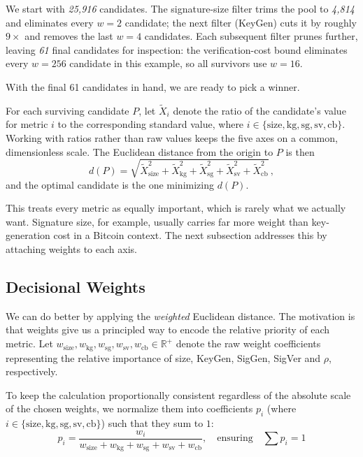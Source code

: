 We start with \emph{25,916} candidates. The signature-size filter trims the pool to \emph{4,814} and eliminates every $w = 2$ candidate; the next filter (KeyGen) cuts it by roughly $9\times$ and removes the last $w = 4$ candidates. Each subsequent filter prunes further, leaving \emph{61} final candidates for inspection: the verification-cost bound eliminates every $w = 256$ candidate in this example, so all survivors use $w = 16$.

With the final 61 candidates in hand, we are ready to pick a winner.

For each surviving candidate $P$, let $\widetilde{X}_i$ denote the ratio of the candidate's value for metric $i$ to the corresponding standard value, where $i \in \{\text{size}, \text{kg}, \text{sg}, \text{sv}, \text{cb}\}$. Working with ratios rather than raw values keeps the five axes on a common, dimensionless scale. The Euclidean distance from the origin to $P$ is then
\begin{equation}
    d(P) = \sqrt{\widetilde{X}_{\text{size}}^2 + \widetilde{X}_{\text{kg}}^2 + \widetilde{X}_{\text{sg}}^2 + \widetilde{X}_{\text{sv}}^2 + \widetilde{X}_{\text{cb}}^2}\,,
    \label{eq:euclidean_distance}
\end{equation}
and the optimal candidate is the one minimizing $d(P)$.

This treats every metric as equally important, which is rarely what we actually want. Signature size, for example, usually carries far more weight than key-generation cost in a Bitcoin context. The next subsection addresses this by attaching weights to each axis.

\subsection{Decisional Weights} \label{sec:decisional-weights}
We can do better by applying the \emph{weighted} Euclidean distance. The motivation is that weights give us a principled way to encode the relative priority of each metric. Let $w_{\text{size}}, w_{\text{kg}}, w_{\text{sg}}, w_{\text{sv}}, w_{\text{cb}} \in \mathbb{R}^+$ denote the raw weight coefficients representing the relative importance of size, KeyGen, SigGen, SigVer and $\rho$, respectively.

To keep the calculation proportionally consistent regardless of the absolute scale of the chosen weights, we normalize them into coefficients $p_i$ (where $i \in \{\text{size}, \text{kg}, \text{sg}, \text{sv}, \text{cb}\}$) such that they sum to $1$:
\begin{equation}
    p_i = \frac{w_i}{w_{\text{size}} + w_{\text{kg}} + w_{\text{sg}} + w_{\text{sv}} + w_{\text{cb}}}, \quad \text{ensuring} \quad \sum p_i = 1
    \label{eq:weight_normalization}
\end{equation}

